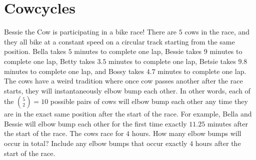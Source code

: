 \documentclass{article}
\begin{document}
\section*{Cowcycles}
Bessie the Cow is participating in a bike race!
There are $5$ cows in the race, and they all bike at a constant speed on a circular track starting from the same position.
Bella takes $5$ minutes to complete one lap, Bessie takes $9$ minutes to complete one lap, Betty takes $3.5$ minutes to complete one lap, Betsie takes $9.8$ minutes to complete one lap, and Bossy takes $4.7$ minutes to complete one lap.
The cows have a weird tradition where once cow passes another after the race starts, they will instantaneously elbow bump each other.
In other words, each of the ${5 \choose 2} = 10$ possible pairs of cows will elbow bump each other any time they are in the exact same position after the start of the race.
For example, Bella and Bessie will elbow bump each other for the first time exactly $11.25$ minutes after the start of the race.
The cows race for $4$ hours.
How many elbow bumps will  occur in total?
Include any elbow bumps that occur exactly $4$ hours after the start of the race.
\end{document}
